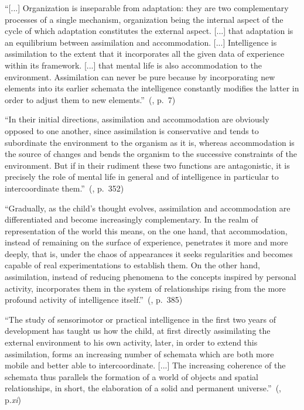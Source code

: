 \documentclass[runningheads]{llncs}
\begin{document}
\begin{adjustwidth}{1cm}{1cm}
``[...] Organization is inseparable from adaptation: they are two complementary processes of a single mechanism, organization being the internal aspect of the cycle of which adaptation constitutes the external aspect. [...] that adaptation is an equilibrium between assimilation and accommodation. [...] Intelligence is assimilation to the extent that it incorporates all the given data of experience within its framework. [...] that mental life is also accommodation to the environment. Assimilation can never be pure because by incorporating new elements into its earlier schemata the intelligence constantly modifies the latter in order to adjust them to new elements.''~(\cite{piaget_origins_1955}, p.~7)

``In their initial directions, assimilation and accommodation are obviously opposed to one another, since assimilation is conservative and tends to subordinate the environment to the organism as it is, whereas accommodation is the source of changes and bends the organism to the successive constraints of the environment. But if in their rudiment these two functions are antagonistic, it is precisely the role of mental life in general and of intelligence in particular to intercoordinate them.''~(\cite{piaget_reality_1955}, p.~352)

``Gradually, as the child's thought evolves, assimilation and accommodation are differentiated and become increasingly complementary. 
In the realm of representation of the world this means, on the one hand, that accommodation, instead of remaining on the surface of experience, penetrates it more and more deeply, that is, under the chaos of appearances it seeks regularities and becomes capable of real experimentations to establish them. 
On the other hand, assimilation, instead of reducing phenomena to the concepts inspired by personal activity, incorporates them in the system of relationships rising from the more profound activity of intelligence itself.''~(\cite{piaget_reality_1955}, p.~385)

``The study of sensorimotor or practical intelligence in the first two years of development has taught us how the child, at first directly assimilating the external environment to his own activity, later, in order to extend this assimilation, forms an increasing number of schemata which are both more mobile and better able to intercoordinate.
[...] The increasing coherence of the schemata thus parallels the formation of a world of objects and spatial relationships, in short, the elaboration of a solid and permanent universe.''~(\cite{piaget_reality_1955}, p.\textit{xi})
\\

\end{adjustwidth}
\end{document}
